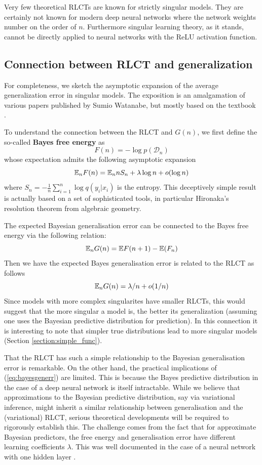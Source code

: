 \documentclass{article} %
\begin{document}
Very few theoretical RLCTs are known for strictly singular models. They are certainly not known for modern deep neural networks where the network weights number on the order of $n$. Furthermore singular learning theory, as it stands, cannot be directly applied to neural networks with the ReLU activation function. 

\subsection{Connection between RLCT and generalization} \label{appendix:generalization_theory}
For completeness, we sketch the asymptotic expansion of the average generalization error in singular models. The exposition is an amalgamation of various papers published by Sumio Watanabe, but mostly based on the textbook \cite{watanabe_algebraic_2009}. 

To understand the connection between the RLCT and $G(n)$, we first define the so-called \textbf{Bayes free energy} as 
\[
F(n) = -\log p(\mathcal D_n)
\]
whose expectation admits the following asymptotic expansion \cite{watanabe_algebraic_2009}
\[
{\mathbb{E}}_n F(n) =  {\mathbb{E}}_n n S_n + \lambda \log n + o(\log n)
\]
where $S_n = -\frac{1}{n} \sum_{i=1}^n \log q(y_i|x_i)$ is the entropy. This deceptively simple result is actually based on a set of sophisticated tools, in particular Hironaka's resolution theorem from algebraic geometry.

The expected Bayesian generalisation error can be connected to the Bayes free energy via the following relation:
\[
{\mathbb{E}}_n G(n) = \mathbb{E} F(n+1) - \mathbb{E}(F_n)
\]
Then we have the expected Bayes generalisation error is related to the RLCT as follows
\begin{equation}
{\mathbb{E}}_n G(n) = \lambda/n + o(1/n)
\label{eq:bayesgenerr}
\end{equation}
Since models with more complex singularites have smaller RLCTs, this would suggest that the more singular a model is, the better its generalization (assuming one uses the Bayesian predictive distribution for prediction). In this connection it is interesting to note that simpler true distributions lead to more singular models (Section \ref{section:simple_func}).

That the RLCT has such a simple relationship to the Bayesian generalisation error is remarkable. On the other hand, the practical implications of (\ref{eq:bayesgenerr}) are limited. This is because the Bayes predictive distribution in the case of a deep neural network is itself intractable. While we believe that approximations to the Bayesian predictive distribution, say via variational inference, might inherit a similar relationship between generalisation and the (variational) RLCT, serious theoretical developments will be required to rigorously establish this. The challenge comes from the fact that for approximate Bayesian predictors, the free energy and generalisation error have different learning coefficients $\lambda$. This was well documented in the case of a neural network with one hidden layer \citep{nakajima_variational_2007}. 
\end{document}
